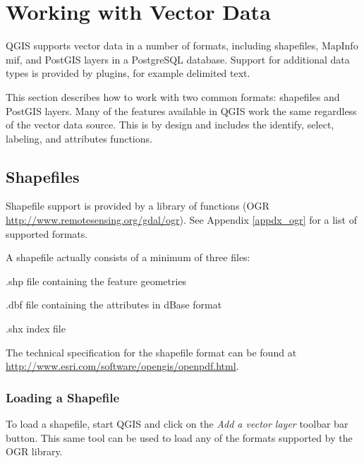 \chapter{Working with Vector Data}
QGIS supports vector data in a number of formats, including shapefiles,
MapInfo mif, and PostGIS layers in a PostgreSQL database. Support for
additional data types is provided by plugins, for example delimited
text.

This section describes how to work with two common formats:
shapefiles and PostGIS layers. Many of the
features available in QGIS work the same regardless of the vector data source.
This is by design and includes the identify, select, labeling, and attributes
functions.

\section{Shapefiles}
Shapefile support is provided by a library of functions (OGR
\url{http://www.remotesensing.org/gdal/ogr}). See Appendix
\ref{appdx_ogr} for a list of supported formats.

A shapefile actually consists of a minimum of three
files:
\begin{compactenum}
\item .shp file containing the feature geometries
\item .dbf file containing the attributes in dBase format
\item .shx index file
\end{compactenum}
The technical specification for the shapefile format can be found at\\
\url{http://www.esri.com/software/opengis/openpdf.html}.
\subsection{Loading a Shapefile}
To load a
shapefile, start QGIS and click on the \textit{Add a vector layer} toolbar bar
button. This same tool can be used to load any of the formats supported by the OGR library.

